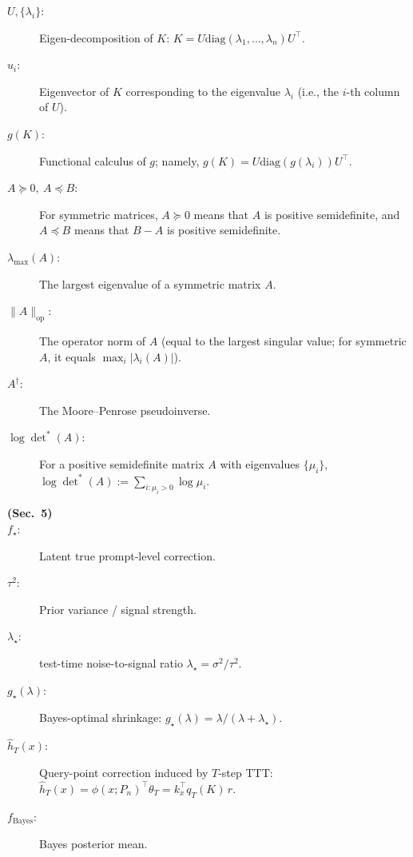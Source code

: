 \documentclass{article}
\theoremstyle{plain}
\theoremstyle{definition}
\theoremstyle{remark}
\begin{document}
\begin{description}
\item[$U,\{\lambda_i\}$:] Eigen-decomposition of $K$:
$K=U\mathrm{diag}(\lambda_1,\dots,\lambda_n)U^\top$.

\item[$u_i$:] Eigenvector of $K$ corresponding to the eigenvalue $\lambda_i$ (i.e., the $i$-th column of $U$).


\item[$g(K)$:] Functional calculus of $g$; namely,
$g(K)=U\mathrm{diag}(g(\lambda_i))U^\top$.


\item[$A\succeq 0,\ A\preceq B$:]
For symmetric matrices, $A\succeq 0$ means that $A$ is positive semidefinite, and
$A\preceq B$ means that $B-A$ is positive semidefinite.

\item[$\lambda_{\max}(A)$:]
The largest eigenvalue of a symmetric matrix $A$.

\item[$\|A\|_{\mathrm{op}}$:]
The operator norm of $A$ (equal to the largest singular value; for symmetric $A$, it equals $\max_i|\lambda_i(A)|$).

\item[$A^{\dagger}$:]
The Moore--Penrose pseudoinverse.

\item[$\log\det^{\!*}(A)$:]
For a positive semidefinite matrix $A$ with eigenvalues $\{\mu_i\}$,
$\log\det^{\!*}(A):=\sum_{i:\mu_i>0}\log \mu_i$.


\item[\textbf{(Sec.~5)}]
\item[$f_\star$:] Latent true prompt-level correction.
\item[$\tau^2$:] Prior variance / signal strength.
\item[$\lambda_\star$:] test-time noise-to-signal ratio $\lambda_\star=\sigma^2/\tau^2$.
\item[$g_\star(\lambda)$:] Bayes-optimal shrinkage: $g_\star(\lambda)=\lambda/(\lambda+\lambda_\star)$.
\item[$\hat h_T(x)$:] Query-point correction induced by $T$-step TTT: $\hat h_T(x)=\phi(x;P_n)^\top\theta_T=k_x^\top q_T(K)\,r$.
\item[$f_{\mathrm{Bayes}}$:] Bayes posterior mean.



\end{description}
\end{document}
